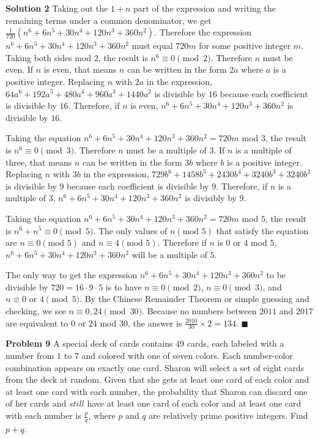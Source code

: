 \documentclass[a4paper,11pt]{article}
\begin{document}
\textbf{Solution 2}
Taking out the $1+n$ part of the expression and writing the remaining terms under a common denominator, we get $\frac{1}{720}(n^6+6n^5+30n^4+120n^3+360n^2)$. Therefore the expression $n^6+6n^5+30n^4+120n^3+360n^2$ must equal $720m$ for some positive integer $m$. Taking both sides mod $2$, the result is $n^6 \equiv 0 \pmod{2}$. Therefore $n$ must be even. If $n$ is even, that means $n$ can be written in the form $2a$ where $a$ is a positive integer. Replacing $n$ with $2a$ in the expression, $64a^6+192a^5+480a^4+960a^3+1440a^2$ is divisible by $16$ because each coefficient is divisible by $16$. Therefore, if $n$ is even, $n^6+6n^5+30n^4+120n^3+360n^2$ is divisible by $16$.

Taking the equation $n^6+6n^5+30n^4+120n^3+360n^2=720m$ mod $3$, the result is $n^6 \equiv 0 \pmod{3}$. Therefore $n$ must be a multiple of $3$. If $n$ is a multiple of three, that means $n$ can be written in the form $3b$ where $b$ is a positive integer. Replacing $n$ with $3b$ in the expression, $729b^6+1458b^5+2430b^4+3240b^3+3240b^2$ is divisible by $9$ because each coefficient is divisible by $9$. Therefore, if $n$ is a multiple of $3$, $n^6+6n^5+30n^4+120n^3+360n^2$ is divisibly by $9$.

Taking the equation $n^6+6n^5+30n^4+120n^3+360n^2=720m$ mod $5$, the result is $n^6+n^5 \equiv 0 \pmod{5}$. The only values of $n (\text{mod }5)$ that satisfy the equation are $n\equiv0(\text{mod }5)$ and $n\equiv4(\text{mod }5)$. Therefore if $n$ is $0$ or $4$ mod $5$, $n^6+6n^5+30n^4+120n^3+360n^2$ will be a multiple of $5$.

The only way to get the expression $n^6+6n^5+30n^4+120n^3+360n^2$ to be divisible by $720=16 \cdot 9 \cdot 5$ is to have $n \equiv 0 \pmod{2}$, $n \equiv 0 \pmod{3}$, and $n \equiv 0 \text{ or } 4 \pmod{5}$. By the Chinese Remainder Theorem or simple guessing and checking, we see $n\equiv0,24 \pmod{30}$. Because no numbers between $2011$ and $2017$ are equivalent to $0$ or $24$ mod $30$, the answer is $\frac{2010}{30}\times2=\boxed{134}$. \hfill $\blacksquare$

\textbf{Problem 9}
A special deck of cards contains $49$ cards, each labeled with a number from $1$ to $7$ and colored with one of seven colors. Each number-color combination appears on exactly one card. Sharon will select a set of eight cards from the deck at random. Given that she gets at least one card of each color and at least one card with each number, the probability that Sharon can discard one of her cards and $\textit{still}$ have at least one card of each color and at least one card with each number is $\frac{p}{q}$, where $p$ and $q$ are relatively prime positive integers. Find $p+q$.
\end{document}
